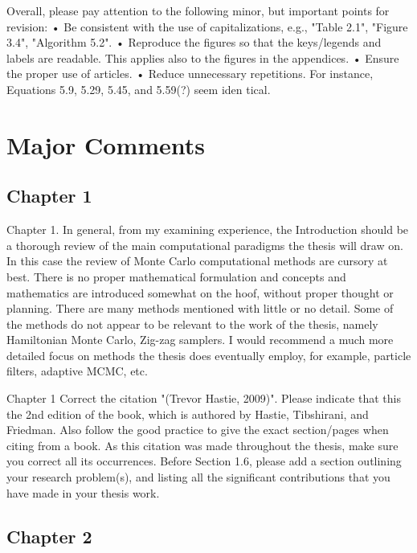 \documentclass[a4paper,18pt]{extarticle}
\begin{document}
Overall, please pay attention to the following minor, but important points for revision:
• Be consistent with the use of capitalizations, e.g., "Table 2.1", "Figure 3.4", "Algorithm 5.2".
• Reproduce the figures so that the keys/legends and labels are readable. This applies also to
the figures in the appendices.
• Ensure the proper use of articles.
• Reduce unnecessary repetitions. For instance, Equations 5.9, 5.29, 5.45, and 5.59(?) seem iden­ tical.

\section{Major Comments}

\subsection{Chapter 1}
Chapter 1. In general, from my examining experience, the Introduction should be a thorough review of the main computational paradigms the thesis will draw on. In this case the review of Monte Carlo computational methods are cursory at best. There is no proper mathematical formulation and concepts and mathematics are introduced somewhat on the hoof, without proper thought or planning. There are many methods mentioned with little or no detail. Some of the methods do not appear to be relevant to the work of the thesis, namely Hamiltonian Monte Carlo, Zig-zag samplers. I would recommend a much more detailed focus on methods the thesis does eventually employ, for example, particle filters, adaptive MCMC, etc.

Chapter 1
Correct the citation "(Trevor Hastie, 2009)". Please indicate that this the 2nd edition of the book, which is authored by Hastie, Tibshirani, and Friedman. Also follow the good practice to give the exact section/pages when citing from a book. As this citation was made throughout the thesis, make sure you correct all its occurrences.
Before Section 1.6, please add a section outlining your research problem(s), and listing all the significant contributions that you have made in your thesis work.
\subsection{Chapter 2}
\end{document}
